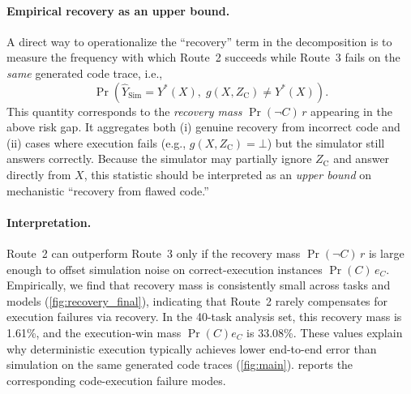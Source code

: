 \paragraph{Empirical recovery as an upper bound.}
A direct way to operationalize the ``recovery'' term in the decomposition is to measure the frequency with which Route~2 succeeds while Route~3 fails on the \emph{same} generated code trace, i.e.,
\[
\Pr\!\left(
\hat Y_{\mathrm{Sim}} = Y^*(X),
\;
g(X,Z_{\mathrm{C}})\neq Y^*(X)
\right).
\]
This quantity corresponds to the \emph{recovery mass} $\Pr(\neg C)\,r$ appearing in the above risk gap.
It aggregates both (i) genuine recovery from incorrect code and (ii) cases where execution fails (e.g., $g(X,Z_{\mathrm{C}})=\bot$) but the simulator still answers correctly.
Because the simulator may partially ignore $Z_{\mathrm{C}}$ and answer directly from $X$, this statistic should be interpreted as an \emph{upper bound} on mechanistic ``recovery from flawed code.''

\paragraph{Interpretation.}
Route~2 can outperform Route~3 only if the recovery mass $\Pr(\neg C)\,r$ is large enough to offset simulation noise on correct-execution instances $\Pr(C)\,e_C$.
Empirically, we find that recovery mass is consistently small across tasks and models (\cref{fig:recovery_final}), indicating that Route~2 rarely compensates for execution failures via recovery.
In the 40-task analysis set, this recovery mass is 1.61\%, and the execution-win mass $\Pr(C)e_C$ is 33.08\%. These values explain why deterministic execution typically achieves lower end-to-end error than simulation on the same generated code traces (\cref{fig:main}).  reports the corresponding code-execution failure modes.

